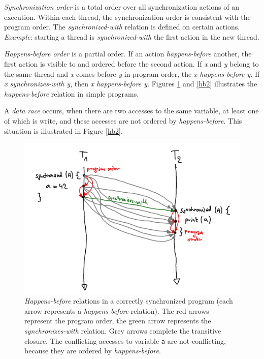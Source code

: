 \emph{Synchronization order} is a total order over all synchronization actions
of an execution. Within each thread, the synchronization order is consistent
with the program order. The \emph{synchronized-with} relation is defined on
certain actions. \emph{Example}: starting a thread is \emph{synchronized-with}
the first action in the new thread.

\emph{Happens-before order} is a partial order. If an action
\emph{happens-before} another, the first action is visible to and ordered before
the second action. If \emph{x} and \emph{y} belong to the same thread and
\emph{x} comes before \emph{y} in program order, the \emph{x happens-before y}.
If \emph{x synchronizes-with y}, then \emph{x happens-before y}. Figures
\ref{hb1} and \ref{hb2} illustrates the \emph{happens-before} relation in simple
programs.

A \emph{data race} occurs, when there are two accesses to the same variable, at
least one of which is write, and these accesses are not ordered by
\emph{happens-before}. This situation is illustrated in Figure \ref{hb2}.

\begin{figure}[hbt]
    \label{hb1}
    \includegraphics[width=\textwidth]{figures/sync_correct.png}
    \caption{\emph{Happens-before} relations in a correctly synchronized program
    (each arrow represents a \emph{happens-before} relation). The red arrows
    represent the program order, the green arrow represents the
    \emph{synchronizes-with} relation. Grey arrows complete the transitive
    closure. The conflicting accesses to variable \texttt{a} are not
    conflicting, because they are ordered by \emph{happens-before}.
    }
\end{figure}

